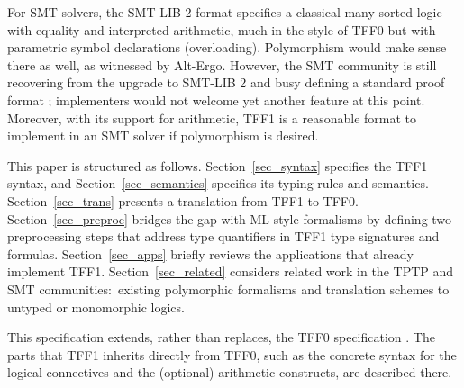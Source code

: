 For SMT solvers, the SMT-LIB 2 format \cite{barrett-et-al-2010} specifies a
classical many-sorted logic with equality and interpreted arithmetic, much in
the style of TFF0 but with parametric symbol declarations (overloading).
Polymorphism would make sense there as well, as witnessed by Alt-Ergo.
However, the SMT community is still recovering from the %
upgrade to SMT-LIB 2 and busy defining a standard proof format
\cite{besson-et-al-2011}; implementers would %
not welcome yet another
feature at this point. Moreover, with its support for arithmetic, TFF1 is a
reasonable format to implement in an SMT solver if polymorphism is desired.

\newcommand\cheat{\vskip0.3ex} %

This paper is structured as follows.
Section~\ref{sec_syntax} specifies the TFF1 syntax, and
Section~\ref{sec_semantics} specifies its typing rules and semantics.
Section~\ref{sec_trans} presents a translation from TFF1 to TFF0.
Section~\ref{sec_preproc} bridges the gap with ML-style formalisms by defining
two preprocessing steps that address type quantifiers in TFF1 type signatures
and formulas.
Section~\ref{sec_apps} briefly reviews the applications that already implement TFF1.
Section~\ref{sec_related} considers related work in the TPTP and SMT
communities:\ existing polymorphic formalisms and translation schemes
to untyped or monomorphic logics.

This specification extends, rather than replaces, the TFF0 specification
\cite{sutcliffe-et-al-2012-tff0}. The parts
that TFF1 inherits directly from TFF0, such as the
concrete syntax for the logical connectives and the
(optional) arithmetic constructs, are described there.
